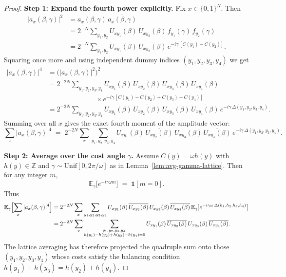 \documentclass[a4paper,onecolumn,11pt,unpublished]{quantumarticle}
\theoremstyle{remark}
\begin{document}
\begin{proof}
\medskip
\noindent\textbf{Step 1: Expand the fourth power explicitly.}
Fix $x\in\{0,1\}^N$.  Then
\begin{align}
  |a_x(\beta,\gamma)|^2
  &= a_x(\beta,\gamma)\,\overline{a_x(\beta,\gamma)} \nonumber\\
  &= 2^{-N}
     \sum_{y_1,y_2}
     U_{xy_1}(\beta)\,\overline{U_{xy_2}(\beta)}\,
     f_{y_1}(\gamma)\,\overline{f_{y_2}(\gamma)}
     \nonumber\\
  &= 2^{-N}
     \sum_{y_1,y_2}
     U_{xy_1}(\beta)\,\overline{U_{xy_2}(\beta)}\,
     e^{-i\gamma\,[C(y_1)-C(y_2)]}.
     \label{eq:ax-sq}
\end{align}
Squaring once more and using independent dummy indices $(y_1,y_2,y_3,y_4)$ we get
\begin{align}
  |a_x(\beta,\gamma)|^4
  &= \bigl(|a_x(\beta,\gamma)|^2\bigr)^2 \nonumber\\
  &= 2^{-2N}
     \sum_{y_1,y_2,y_3,y_4}
     U_{xy_1}(\beta)\,\overline{U_{xy_2}(\beta)}\,
     U_{xy_3}(\beta)\,\overline{U_{xy_4}(\beta)}  \nonumber\\[-0.25em]
  &\hspace{7em}\times
     e^{-i\gamma\,[C(y_1)-C(y_2)+C(y_3)-C(y_4)]}
     \nonumber\\
  &= 2^{-2N}
     \sum_{y_1,y_2,y_3,y_4}
     U_{xy_1}(\beta)\,\overline{U_{xy_2}(\beta)}\,
     U_{xy_3}(\beta)\,\overline{U_{xy_4}(\beta)}\,
     e^{-i\gamma\,\Delta(y_1,y_2,y_3,y_4)}.
     \label{eq:ax-fourth-expanded}
\end{align}
Summing over all $x$ gives the exact fourth moment of the amplitude vector:
\begin{equation}
  \sum_{x} |a_x(\beta,\gamma)|^4
  \;=\;
  2^{-2N}\!\!\sum_{x}
  \sum_{y_1,y_2,y_3,y_4}
  U_{xy_1}(\beta)\,\overline{U_{xy_2}(\beta)}\,
  U_{xy_3}(\beta)\,\overline{U_{xy_4}(\beta)}\,
  e^{-i\gamma\,\Delta(y_1,y_2,y_3,y_4)}.
  \label{eq:fourth-moment-full}
\end{equation}

\medskip
\noindent\textbf{Step 2: Average over the cost angle $\gamma$.}
Assume $C(y)=\omega h(y)$ with $h(y)\in\mathbb{Z}$ and
$\gamma\sim\mathrm{Unif}[0,2\pi/\omega]$ as in Lemma~\ref{lem:avg-gamma-lattice}.
Then for any integer $m$,
\[
  \mathbb{E}_\gamma\!\bigl[e^{-i\gamma\omega m}\bigr]
  \;=\;
  \mathbf{1}[m=0].
\]
Thus
\begin{align}
  \mathbb{E}_\gamma\Bigl[\sum_{x}|a_x(\beta,\gamma)|^4\Bigr]
  &= 2^{-2N}
     \sum_{x}
     \sum_{y_1,y_2,y_3,y_4}
     U_{xy_1}(\beta)\,\overline{U_{xy_2}(\beta)}\,
     U_{xy_3}(\beta)\,\overline{U_{xy_4}(\beta)}\,
     \mathbb{E}_\gamma\!\bigl[e^{-i\gamma\omega\,\Delta(h_1,h_2,h_3,h_4)}\bigr]
     \nonumber\\
  &= 2^{-2N}
     \sum_{x}
     \sum_{\substack{y_1,y_2,y_3,y_4:\\
                     h(y_1)-h(y_2)+h(y_3)-h(y_4)=0}}
     U_{xy_1}(\beta)\,\overline{U_{xy_2}(\beta)}\,
     U_{xy_3}(\beta)\,\overline{U_{xy_4}(\beta)}.
     \label{eq:gamma-avg-quadruples}
\end{align}
The lattice averaging has therefore projected the quadruple sum onto those
$(y_1,y_2,y_3,y_4)$ whose costs satisfy the balancing condition
$h(y_1)+h(y_3)=h(y_2)+h(y_4)$.


\end{proof}
\end{document}
